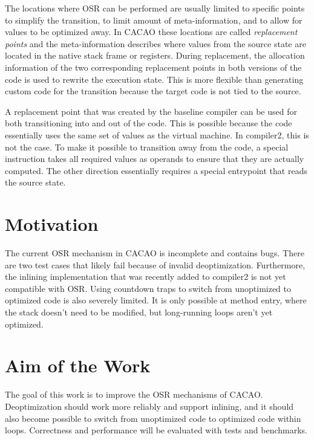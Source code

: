 \documentclass[draft,final]{vutinfth} %
\begin{document}
    The locations where OSR can be performed are usually limited to specific points
    to simplify the transition, to limit amount of meta-information, and to allow for values to be optimized away.
    In CACAO these locations are called \emph{replacement points}
    and the meta-information describes where values
    from the source state are located in the native stack frame or registers.
    During replacement, the allocation information of the two corresponding replacement points
    in both versions of the code is used to rewrite the execution state.
    This is more flexible than generating custom code for the transition
    because the target code is not tied to the source.

    A replacement point that was created by the baseline compiler can be used for both
    transitioning into and out of the code.
    This is possible because the code essentially uses the same set of values as the virtual machine.
    In compiler2, this is not the case.
    To make it possible to transition away from the code, a special instruction takes all required values as operands to ensure that they are actually computed.
    The other direction essentially requires a special entrypoint that reads the source state.


    \section{Motivation}

    The current OSR mechanism in CACAO is incomplete and contains bugs.
    There are two test cases that likely fail because of invalid deoptimization.
    Furthermore, the inlining implementation\cite{MethodInlining} that was recently added to compiler2 is not yet compatible with OSR.
    Using countdown traps to switch from unoptimized to optimized code is also severely limited.
    It is only possible at method entry, where the stack doesn't need to be modified,
    but long-running loops aren't yet optimized.


    \section{Aim of the Work}

    The goal of this work is to improve the OSR mechanisms of CACAO.
    Deoptimization should work more reliably and support inlining,
    and it should also become possible to switch from unoptimized code to optimized code within loops.
    Correctness and performance will be evaluated with tests and benchmarks.
\end{document}
